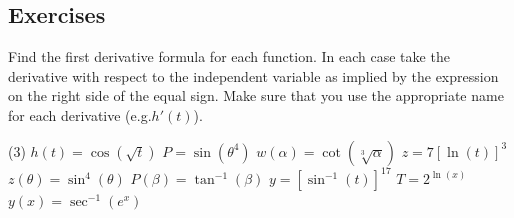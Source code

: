 \documentclass[10pt,oneside,]{book}
\theoremstyle{plain}
\theoremstyle{definition}
\numberwithin{equation}{section}
\newcounter{figstack}
\newcounter{figindex}
\newlength\fight
\newcommand\pushValignCaptionBottom[5][b]{%
\stepcounter{figstack}%
\expandafter\def\csname %
figalign\romannumeral\value{figstack}\endcsname{#1}%
\expandafter\def\csname %
figtype\romannumeral\value{figstack}\endcsname{#2}%
\expandafter\def\csname %
figwd\romannumeral\value{figstack}\endcsname{#3}%
\expandafter\def\csname %
figcontent\romannumeral\value{figstack}\endcsname{#4}%
\expandafter\def\csname %
figcap\romannumeral\value{figstack}\endcsname{#5}%
\setbox0=\hbox{%
\begin{#2}{#3}#4\end{#2}}%
\ifdim\dimexpr\ht0+\dp0\relax>\fight\global\setlength{\fight}{%
\dimexpr\ht0+\dp0\relax}\fi%
}
\newcommand\popValignCaptionBottom{%
\setcounter{figindex}{0}%
\hfill%
\whiledo{\value{figindex}<\value{figstack}}{%
\stepcounter{figindex}%
\def\tmp{\csname figwd\romannumeral\value{figindex}\endcsname}%
\begin{\csname figtype\romannumeral\value{figindex}\endcsname}[t]{\tmp}%
\centering%
\stackinset{c}{}%
{\csname figalign\romannumeral\value{figindex}\endcsname}{}%
{\csname figcontent\romannumeral\value{figindex}\endcsname}%
{\rule{0pt}{\fight}}\par%
\csname figcap\romannumeral\value{figindex}\endcsname%
\end{\csname figtype\romannumeral\value{figindex}\endcsname}%
\hfill%
}%
\setcounter{figstack}{0}%
\setlength{\fight}{0pt}%
\hfill%
}
\newcommand{\fe}[2]{#1\mathopen{}\left(#2\right)\mathclose{}}
\newcommand{\fd}[1]{#1'}
\begin{document}
\subsection[Exercises]{Exercises}\label{exercises-43}
\hypertarget{exercisegroup-92}{\null}Find the first derivative formula for each function.  In each case take the derivative with respect to the independent variable as implied by the expression on the right side of the equal sign.  Make sure that you use the appropriate name for each derivative (e.g.\@ \(\fe{\fd{h}}{t}\)).%
\par
\begin{exercisegroup}(3)
\exercise[1.]\hypertarget{exercise-441}{\null}\(\fe{h}{t}=\fe{\cos}{\sqrt{t}}\)%
\exercise[2.]\hypertarget{exercise-442}{\null}\(P=\fe{\sin}{\theta^4}\)%
\exercise[3.]\hypertarget{exercise-443}{\null}\(\fe{w}{\alpha}=\fe{\cot}{\sqrt[3]{\alpha}}\)%
\exercise[4.]\hypertarget{exercise-444}{\null}\(z=7\left[\fe{\ln}{t}\right]^3\)%
\exercise[5.]\hypertarget{exercise-445}{\null}\(\fe{z}{\theta}=\fe{\sin^4}{\theta}\)%
\exercise[6.]\hypertarget{exercise-446}{\null}\(\fe{P}{\beta}=\fe{\tan^{-1}}{\beta}\)%
\exercise[7.]\hypertarget{exercise-447}{\null}\(y=\left[\fe{\sin^{-1}}{t}\right]^{17}\)%
\exercise[8.]\hypertarget{exercise-448}{\null}\(T=2^{\fe{\ln}{x}}\)%
\exercise[9.]\hypertarget{exercise-449}{\null}\(\fe{y}{x}=\fe{\sec^{-1}}{e^x}\)%
\end{exercisegroup}
\par\smallskip\noindent
\hypertarget{exercisegroup-93}{\null}
\end{document}
